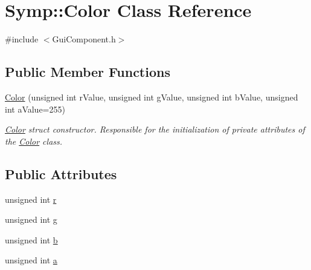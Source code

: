 \hypertarget{struct_symp_1_1_color}{\section{Symp\-:\-:Color Class Reference}
\label{struct_symp_1_1_color}
}


{\ttfamily \#include $<$Gui\-Component.\-h$>$}

\subsection*{Public Member Functions}
\begin{DoxyCompactItemize}
\item 
\hyperlink{struct_symp_1_1_color_a182d56f6f2b8ad205d686845504d755e}{Color} (unsigned int r\-Value, unsigned int g\-Value, unsigned int b\-Value, unsigned int a\-Value=255)
\begin{DoxyCompactList}\small\item\em \hyperlink{struct_symp_1_1_color}{Color} struct constructor. Responsible for the initialization of private attributes of the \hyperlink{struct_symp_1_1_color}{Color} class. \end{DoxyCompactList}\end{DoxyCompactItemize}
\subsection*{Public Attributes}
\begin{DoxyCompactItemize}
\item 
unsigned int \hyperlink{struct_symp_1_1_color_aa793f972ed87529d8b841d601a575faa}{r}
\item 
unsigned int \hyperlink{struct_symp_1_1_color_a9647c7f07beac0f0851609a3ba2db21c}{g}
\item 
unsigned int \hyperlink{struct_symp_1_1_color_a71b5f200ef4f3b72ab507bc9cd41e8cc}{b}
\item 
unsigned int \hyperlink{struct_symp_1_1_color_af948ec8fb21c5e8faaa2061fe4122953}{a}
\end{DoxyCompactItemize}
